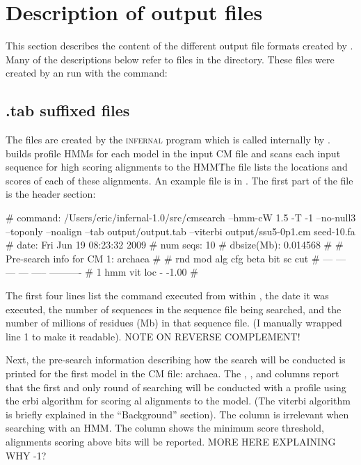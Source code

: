 \section{Description of output files}

This section describes the content of the different output file
formats created by . Many of the descriptions below
refer to files in the  directory. These files
were created by an  run with the command:


\subsection{.tab suffixed files}

The  files are created by the \textsc{infernal} program
 which is called internally by
.  builds profile HMMs for each model
in the input CM file and scans each input sequence for high scoring
alignments to the HMM\. The  file lists the locations and
scores of each of these alignments. An example  file is in 
. The first part of the file is the
header section:

\begin{sreoutput}
# command:    /Users/eric/infernal-1.0/src/cmsearch --hmm-cW 1.5 -T -1 --no-null3 \\
--toponly --noalign --tab output/output.tab --viterbi output/ssu5-0p1.cm seed-10.fa
# date:       Fri Jun 19 08:23:32 2009
# num seqs:   10
# dbsize(Mb): 0.014568
#
# Pre-search info for CM 1: archaea
#
# rnd  mod  alg  cfg   beta  bit sc cut
# ---  ---  ---  ---  -----  ----------
#   1  hmm  vit  loc      -       -1.00
#
\end{sreoutput}

The first four lines list the  command executed from
within , the date it was executed, the number of
sequences in the sequence file being searched, and the number of
millions of residues (Mb) in that sequence file. (I manually
wrapped line 1 to make it readable). NOTE ON REVERSE COMPLEMENT!

Next, the pre-search information describing how the search will be
conducted is printed for the first model in the CM file: archaea. 
The , ,  and  columns report
that the first and only round of searching will be conducted with a
profile  using the erbi algorithm for scoring
al alignments to the model. (The viterbi algorithm is
briefly explained in the ``Background'' section). The 
column is irrelevant when searching with an HMM. The 
column shows the minimum score threshold, alignments scoring above
 bits will be reported. MORE HERE EXPLAINING WHY -1?

